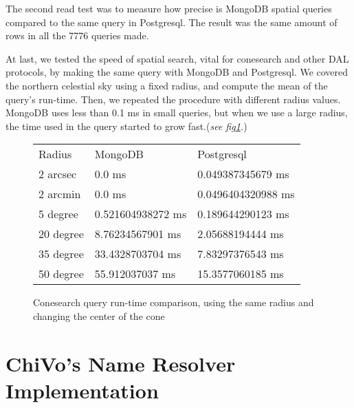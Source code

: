 \documentclass[11pt,twoside]{article}
\begin{document}
    The second read test was to measure how precise is MongoDB spatial queries
    compared to the same query in Postgresql.
    The result was the same amount of rows in all the 7776 queries made.
                
    At last, we tested the speed of spatial search, vital for conesearch and
    other DAL protocols, by making the same query with MongoDB 
    and Postgresql. We covered the northern celestial sky using a fixed radius,
    and compute the mean of the query's run-time. Then, we repeated the
    procedure with different radius values. MongoDB uses less than 0.1 ms in small queries, 
    but when we use a large radius, the time used
    in the query started to grow fast.(\emph{see fig\ref{fig:cone}.})
\begin{figure}
\centering

\begin{tabular}{lll}
 Radius &MongoDB &Postgresql\\
2 arcsec&0.0 ms &0.049387345679 ms\\
2 arcmin&0.0 ms &0.0496404320988 ms\\
5 degree&0.521604938272 ms&0.189644290123 ms\\ 
20 degree &8.76234567901 ms&2.05688194444 ms\\
35 degree &33.4328703704 ms& 7.83297376543 ms\\
50 degree & 55.912037037 ms&15.3577060185 ms
\end{tabular}


\caption{Conesearch query run-time comparison, using the same radius and changing the center of the cone}
\label{fig:cone}
\end{figure}    

\section{ChiVo's Name Resolver Implementation}
  
\end{document}
